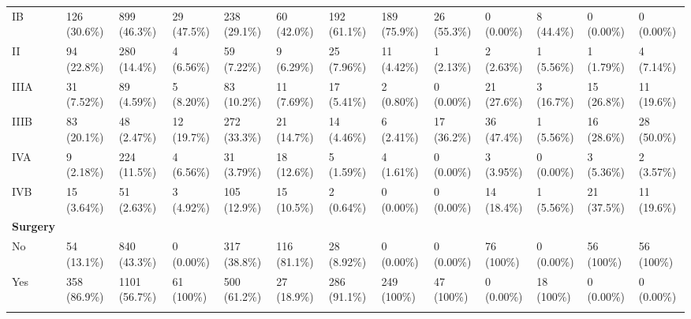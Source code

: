 \documentclass{article}
\begin{document}
\begin{landscape}
\begin{tiny}
\begin{tabularx}{\linewidth}{p{4.5cm}|X|X|X|X|X|X|X|X|X|X|X|X}
\rowcolor{gray!10}
    IB &   126 (30.6\%)    &   899 (46.3\%)    &    29 (47.5\%)    &   238 (29.1\%)    &    60 (42.0\%)    &   192 (61.1\%)    &   189 (75.9\%)    &    26 (55.3\%)    &    0 (0.00\%)     &    8 (44.4\%)     &    0 (0.00\%)     &    0 (0.00\%)     \\
\rowcolor{gray!10}
    II &    94 (22.8\%)    &   280 (14.4\%)    &    4 (6.56\%)     &    59 (7.22\%)    &    9 (6.29\%)     &    25 (7.96\%)    &    11 (4.42\%)    &    1 (2.13\%)     &    2 (2.63\%)     &    1 (5.56\%)     &    1 (1.79\%)     &    4 (7.14\%)     \\
\rowcolor{gray!10}
    IIIA &    31 (7.52\%)    &    89 (4.59\%)    &    5 (8.20\%)     &    83 (10.2\%)    &    11 (7.69\%)    &    17 (5.41\%)    &    2 (0.80\%)     &    0 (0.00\%)     &    21 (27.6\%)    &    3 (16.7\%)     &    15 (26.8\%)    &    11 (19.6\%)    \\
\rowcolor{gray!10}
    IIIB &    83 (20.1\%)    &    48 (2.47\%)    &    12 (19.7\%)    &   272 (33.3\%)    &    21 (14.7\%)    &    14 (4.46\%)    &    6 (2.41\%)     &    17 (36.2\%)    &    36 (47.4\%)    &    1 (5.56\%)     &    16 (28.6\%)    &    28 (50.0\%)    \\
\rowcolor{gray!10}
    IVA &    9 (2.18\%)     &   224 (11.5\%)    &    4 (6.56\%)     &    31 (3.79\%)    &    18 (12.6\%)    &    5 (1.59\%)     &    4 (1.61\%)     &    0 (0.00\%)     &    3 (3.95\%)     &    0 (0.00\%)     &    3 (5.36\%)     &    2 (3.57\%)     \\
\rowcolor{gray!10}
    IVB &    15 (3.64\%)    &    51 (2.63\%)    &    3 (4.92\%)     &   105 (12.9\%)    &    15 (10.5\%)    &    2 (0.64\%)     &    0 (0.00\%)     &    0 (0.00\%)     &    14 (18.4\%)    &    1 (5.56\%)     &    21 (37.5\%)    &    11 (19.6\%)    \\
\rowcolor{gray!30}
\textbf{Surgery }  &  &  &  &  &  &  &  &  &  &  &  &  \\
\rowcolor{gray!10}
    No &    54 (13.1\%)    &   840 (43.3\%)    &    0 (0.00\%)     &   317 (38.8\%)    &   116 (81.1\%)    &    28 (8.92\%)    &    0 (0.00\%)     &    0 (0.00\%)     &    76 (100\%)     &    0 (0.00\%)     &    56 (100\%)     &    56 (100\%)     \\
\rowcolor{gray!10}
    Yes &   358 (86.9\%)    &   1101 (56.7\%)   &    61 (100\%)     &   500 (61.2\%)    &    27 (18.9\%)    &   286 (91.1\%)    &    249 (100\%)    &    47 (100\%)     &    0 (0.00\%)     &    18 (100\%)     &    0 (0.00\%)     &    0 (0.00\%)     \\
\rowcolor{gray!30}

\end{tabularx}
\end{tiny}
\end{landscape}
\end{document}
